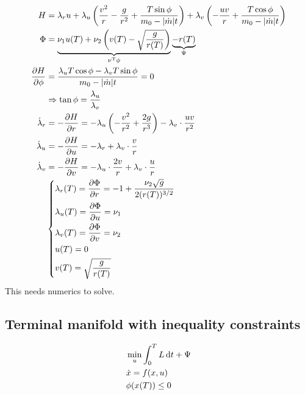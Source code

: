 \begin{align}
  H &= \lambda_r u + \lambda_u \left( \frac{v^2}{r} - \frac{g}{r^2} + \frac{T\sin\phi}{m_0-|\dot m|t} \right) + \lambda_v \left(-\frac{uv}{r} + \frac{T\cos\phi}{m_0-|\dot m|t} \right) \\
  \Phi &= \underbrace{\nu_1 u(T) + \nu_2 \left(v(T) - \sqrt{\frac{g}{r(T)}}\right)}_{\nu^\text{T}\phi} \underbrace{- r(T)}_{\Psi} \\
  \frac{\partial H}{\partial \phi} &= \frac{\lambda_u T\cos\phi - \lambda_v T\sin\phi}{m_0 - |\dot m|t} = 0 \\
    & \Rightarrow \tan\phi = \frac{\lambda_u}{\lambda_v} \\
  \dot\lambda_r &= -\frac{\partial H}{\partial r} = -\lambda_u \left(-\frac{v^2}{r^2} + \frac{2g}{r^3}\right) - \lambda_v\cdot\frac{uv}{r^2} \\
  \dot\lambda_u &= -\frac{\partial H}{\partial u} = -\lambda_r + \lambda_v\cdot \frac{v}{r} \\
  \dot\lambda_v &= -\frac{\partial H}{\partial v} = -\lambda_u\cdot \frac{2v}{r} + \lambda_v\cdot \frac{u}{r} \\
    & \begin{dcases}
      \lambda_r(T) = \frac{\partial \Phi}{\partial r} = -1 + \frac{\nu_2\sqrt{g}}{2(r(T))^{3/2}} \\
      \lambda_u(T) = \frac{\partial \Phi}{\partial u} = \nu_1 \\
      \lambda_v(T) = \frac{\partial \Phi}{\partial v} = \nu_2 \\
      u(T) = 0 \\
      v(T) = \sqrt{\frac{g}{r(T)}}
    \end{dcases}
\end{align}
This needs numerics to solve.

\subsection{Terminal manifold with inequality constraints}
\begin{align}
  & \min_u \int_0^T L\mathop{}\!\mathrm{d} t + \Psi \\
  & \dot x = f(x,u) \\
  & \phi(x(T)) \le 0
\end{align}

\begin{center}
\end{center}

